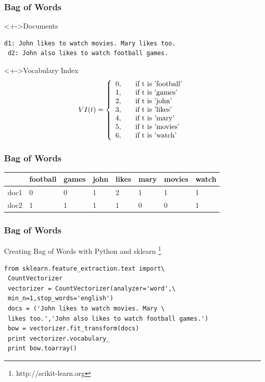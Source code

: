 \documentclass[serif,11pt,aspectratio=1610,table]{beamer}
\begin{document}
\begin{frame}[fragile]
 \frametitle{Bag of Words}
 \begin{block}<+->{Documents}
  \begin{Verbatim}[frame=single]
 d1: John likes to watch movies. Mary likes too.
 d2: John also likes to watch football games.
  \end{Verbatim}
  \end{block}

 \begin{block}<+->{Vocabulary Index}
  \begin{displaymath}
  VI(t) = \left\{ 
 \begin{array}{l l l l l l l} 
  0, & \quad \text{if t is 'football'} \\
  1, & \quad \text{if t is  'games'} \\
  2, & \quad \text{if t is 'john'} \\
  3, & \quad \text{if t is 'likes'} \\
  4, & \quad \text{if t is  'mary'} \\ 
  5, & \quad \text{if t is 'movies'} \\ 
  6, & \quad \text{if t is 'watch'} \\
 \end{array}\right.
 \end{displaymath}

 \end{block}

\end{frame}

\begin{frame}[fragile]
 \frametitle{Bag of Words}
  \begin{tabular}{|l|l|l|l|l|l|l|l|}
  \hline
   & football & games & john & likes & mary & movies & watch \\ \hline
  doc1 & 0 & 0 & 1 & 2 & 1 & 1 & 1 \\ \hline
  doc2 & 1 & 1 & 1 & 1 & 0 & 0 & 1 \\
  \hline
  \end{tabular}
\end{frame}


\begin{frame}[fragile]
 \frametitle{Bag of Words}
Creating Bag of Words with Python and sklearn \footnote{http://scikit-learn.org}
\footnotesize
\begin{Verbatim}[frame=single]
 from sklearn.feature_extraction.text import\
 CountVectorizer
 vectorizer = CountVectorizer(analyzer='word',\
 min_n=1,stop_words='english')
 docs = ('John likes to watch movies. Mary \
 likes too.','John also likes to watch football games.')
 bow = vectorizer.fit_transform(docs)
 print vectorizer.vocabulary_
 print bow.toarray()
\end{Verbatim}

\end{frame}
\end{document}
